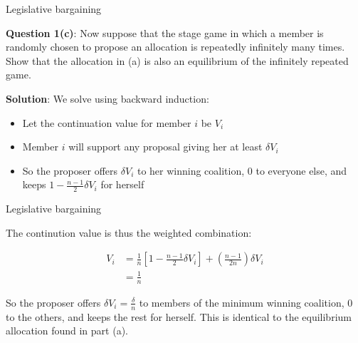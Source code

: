 \documentclass[11pt,aspectratio=169]{beamer}
\begin{document}
\begin{frame}{Legislative bargaining}

\textbf{Question 1(c)}: Now suppose that the stage game in which a member is randomly chosen to propose an allocation is repeatedly \alert{infinitely many times}. Show that the allocation in (a) is also an equilibrium of the infinitely repeated game. \pause 

\textbf{Solution}: We solve using backward induction: 

\begin{itemize}
\item Let the continuation value for member $i$ be $V_i$ \pause
\item Member $i$ will support any proposal giving her at least $\delta V_i$ \pause 
\item So the proposer offers $\delta V_i$ to her winning coalition, 0 to everyone else, and keeps $1 - \frac{n-1}{2} \delta V_i$ for herself
\end{itemize}


\end{frame}

\begin{frame}{Legislative bargaining}

The continution value is thus the weighted combination:

\begin{align*}
 V_i &= \frac{1}{n} \left[ 1 - \frac{n-1}{2} \delta V_i \right] + \left( \frac{n-1}{2n} \right) \delta V_i \\  
 &= \frac{1}{n}
 \end{align*}
 
 \pause 
So the proposer offers $\delta V_i = \frac{\delta}{n}$ to members of the minimum winning coalition, 0 to the others, and keeps the rest for herself. This is identical to the equilibrium allocation found in part (a). 



\end{frame}
\end{document}
